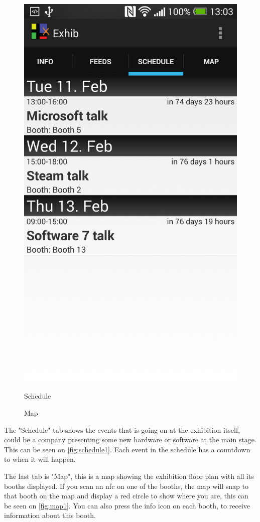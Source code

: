 \begin{figure}[H]
\begin{minipage}[b]{0.5\columnwidth}
\centering
\includegraphics[width=0.7\columnwidth]{img/finaldesign/schedule.png}
\caption{Schedule}
\label{fig:schedule1}
\end{minipage}
\hspace{0.5cm}
\begin{minipage}[b]{0.5\columnwidth}
\centering
\caption{Map}
\label{fig:map1}
%
\missingfigure{}
\end{minipage}
\end{figure}

The "Schedule" tab shows the events that is going on at the exhibition itself, could be a company presenting some new hardware or software at the main stage. This can be seen on \autoref{fig:schedule1}. Each event in the schedule has a countdown to when it will happen. 

The last tab is "Map", this is a map showing the exhibition floor plan with all its booths displayed. If you scan an \ac{nfc} on one of the booths, the map will snap to that booth on the map and display a red circle to show where you are, this can be seen on \autoref{fig:map1}. You can also press the info icon on each booth, to receive information about this booth.

